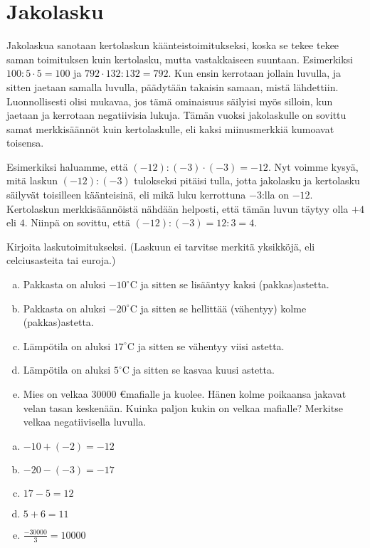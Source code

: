 \section{Jakolasku}

Jakolaskua sanotaan kertolaskun käänteistoimitukseksi, koska se tekee tekee saman toimituksen kuin kertolasku, mutta vastakkaiseen suuntaan. Esimerkiksi $100:5\cdot 5=100$ ja $792\cdot 132:132=792$. Kun ensin kerrotaan jollain luvulla, ja sitten jaetaan samalla luvulla, päädytään takaisin samaan, mistä lähdettiin. Luonnollisesti olisi mukavaa, jos tämä ominaisuus säilyisi myös silloin, kun jaetaan ja kerrotaan negatiivisia lukuja. Tämän vuoksi jakolaskulle on sovittu samat merkkisäännöt kuin kertolaskulle, eli kaksi miinusmerkkiä kumoavat toisensa.

Esimerkiksi haluamme, että $(-12):(-3)\cdot (-3)=-12$. Nyt voimme kysyä, mitä laskun $(-12):(-3)$ tulokseksi pitäisi tulla, jotta jakolasku ja kertolasku säilyvät toisilleen käänteisinä, eli mikä luku kerrottuna $-3$:lla on $-12$. Kertolaskun merkkisäännöistä nähdään helposti, että tämän luvun täytyy olla $+4$ eli $4$. Niinpä on sovittu, että $(-12):(-3)=12:3=4$.

\begin{tehtava}
Kirjoita laskutoimitukseksi. (Laskuun ei tarvitse merkitä yksikköjä, eli celciusasteita tai euroja.)
\begin{enumerate}[a)]
\item Pakkasta on aluksi $-10^{\circ}$C ja sitten se lisääntyy kaksi (pakkas)astetta.
\item Pakkasta on aluksi $-20^{\circ}$C ja sitten se hellittää (vähentyy) kolme (pakkas)astetta.
\item Lämpötila on aluksi $17^{\circ}$C ja sitten se vähentyy viisi astetta.
\item Lämpötila on aluksi $5^{\circ}$C ja sitten se kasvaa kuusi astetta.
\item Mies on velkaa $30 000$ \euro mafialle ja kuolee. Hänen kolme poikaansa jakavat velan tasan keskenään. Kuinka paljon kukin on velkaa mafialle? Merkitse velkaa negatiivisella luvulla.
\end{enumerate}
\begin{vastaus}
\begin{enumerate}[a)]
\item $-10+(-2)=-12$
\item $-20-(-3)=-17$
\item $17-5=12$
\item $5+6=11$
\item $\frac{-30 000}{3}=10 000$
\end{enumerate}
\end{vastaus}
\end{tehtava}


